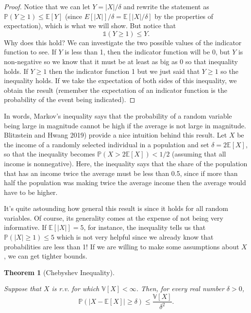 \documentclass[
  letterpaper,
  DIV=11,
  numbers=noendperiod]{scrreprt}
\newcommand{\E}{\mathbb{E}}
\newcommand{\V}{\mathbb{V}}
\renewcommand{\P}{\mathbb{P}}
\theoremstyle{definition}
\theoremstyle{plain}
\newtheorem{theorem}{Theorem}[chapter]
\theoremstyle{definition}
\theoremstyle{remark}
\begin{document}
\begin{proof}

Notice that we can let \(Y = |X|/\delta\) and rewrite the statement as
\(\P(Y \geq 1) \leq \E[Y]\) (since \(E[|X|]/\delta = \E[|X|/\delta]\) by
the properties of expectation), which is what we will show. But notice
that \[
\mathbb{1}(Y \geq 1) \leq Y.
\] Why does this hold? We can investigate the two possible values of the
indicator function to see. If \(Y\) is less than 1, then the indicator
function will be 0, but \(Y\) is non-negative so we know that it must be
at least as big as 0 so that inequality holds. If \(Y \geq 1\) then the
indicator function 1 but we just said that \(Y \geq 1\) so the
inequality holds. If we take the expectation of both sides of this
inequality, we obtain the result (remember the expectation of an
indicator function is the probability of the event being indicated).

\end{proof}

In words, Markov's inequality says that the probability of a random
variable being large in magnitude cannot be high if the average is not
large in magnitude. Blitzstein and Hwang 2019) provide a nice intuition
behind this result. Let \(X\) be the income of a randomly selected
individual in a population and set \(\delta = 2\E[X]\), so that the
inequality becomes \(\P(X > 2\E[X]) < 1/2\) (assuming that all income is
nonnegative). Here, the inequality says that the share of the population
that has an income twice the average must be less than 0.5, since if
more than half the population was making twice the average income then
the average would have to be higher.

It's quite astounding how general this result is since it holds for all
random variables. Of course, its generality comes at the expense of not
being very informative. If \(\E[|X|] = 5\), for instance, the inequality
tells us that \(\P(|X| \geq 1) \leq 5\) which is not very helpful since
we already know that probabilities are less than 1! If we are willing to
make some assumptions about \(X\), we can get tighter bounds.

\leavevmode{}%
\begin{theorem}[Chebyshev Inequality]\label{thm-chebyshev}

Suppose that \(X\) is r.v. for which \(\V[X] < \infty\). Then, for every
real number \(\delta > 0\), \[
\P(|X-\E[X]| \geq \delta) \leq \frac{\V[X]}{\delta^2}.
\]

\end{theorem}
\end{document}
